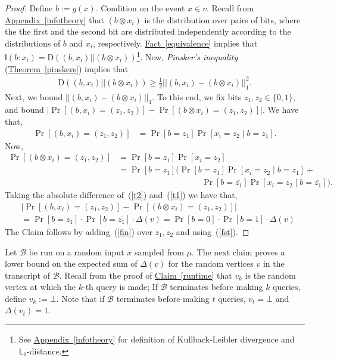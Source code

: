 \documentclass[11pt]{article}
\numberwithin{equation}{section}
\theoremstyle{definition}
\theoremstyle{plain}
\newcommand{\expref}[2]{\hyperref[#2]{#1~\ref{#2}}}
\newcommand{\Div}{\text{D}}
\newcommand{\clB}{\mathcal{B}}
\newcommand{\I}{\mathsf{I}}
\begin{document}
\begin{proof}
  Define $b:=g(x)$. Condition on the event $x \in v$. Recall from \expref{Appendix}{infotheory} that $(b \otimes x_i)$
   is the distribution over pairs of bits, where
the %
the first and the second bit are %
 distributed independently according to the distributions of $b$ and $x_i$,
respectively.  %
%
 \expref{Fact}{equivalence} implies that $\I(b : x_i)=\Div((b,x_i) || (b \otimes x_i))$\footnote{See \expref{Appendix}{infotheory} for definition of Kullback-Leibler divergence and $\mathsf{L}_1$-distance.}. Now, \emph{Pinsker's inequality} (\expref{Theorem}{pinskers}) implies that 
\begin{align}
\label{fst}\Div((b,x_i) || (b \otimes x_i)) \geq \frac{1}{2} ||(b,x_i)-(b \otimes x_i)||^2_1.
\end{align}
Next, we bound $||(b,x_i)-(b \otimes x_i)||_1$. To this end, we fix bits $z_1, z_2 \in \{0,1\}$, and bound $|\Pr[(b,x_i)=(z_1,z_2)]-\Pr[(b \otimes x_i)=(z_1,z_2)]|$. We have that,
\begin{align}
\label{t1} \Pr[(b,x_i)=(z_1,z_2)]&=\Pr[b=z_1]\Pr[x_i=z_2 \mid b = z_1].
\end{align}
Now,
\begin{align}
\label{t2} \Pr[(b \otimes x_i)=(z_1,z_2)]&=\Pr[b=z_1]\Pr[x_i=z_2] \nonumber \\
&=\Pr[b=z_1](\Pr[b=z_1]\Pr[x_i=z_2 \mid b=z_1]+&\nonumber \\
& \qquad \qquad \qquad \qquad \qquad \Pr[b=\overline{z_1}]\Pr[x_i=z_2 \mid b=\overline{z_1}]).
\end{align}
Taking the absolute difference of~(\ref{t2}) and~(\ref{t1}) we have that,
\begin{align}
&|\Pr[(b,x_i)=(z_1,z_2)]-\Pr[(b \otimes x_i)=(z_1,z_2)]| \nonumber \\
&=\Pr[b=z_1] \cdot \Pr[b=\overline{z_1}] \cdot \Delta(v)=\Pr[b=0] \cdot \Pr[b=1] \cdot \Delta(v)\label{fin}
\end{align}
The Claim follows by adding~(\ref{fin}) over $z_1, z_2$ and using~(\ref{fst}).
\end{proof}
Let  $\clB$ be run on a random input $x$ sampled from $\mu$. The next claim proves a lower bound on the expected sum of $\Delta(v)$ for the random vertices $v$ in the transcript of $\clB$. Recall from the proof of \expref{Claim}{runtime}
that $v_k$ is the random vertex at which the $k$-th query is made; If $\clB$ terminates before making $k$ queries, define $v_k:=\bot$. Note that if $\clB$ terminates before making $t$ queries, $v_t=\bot$ and $\Delta(v_t)=1$.
\end{document}
